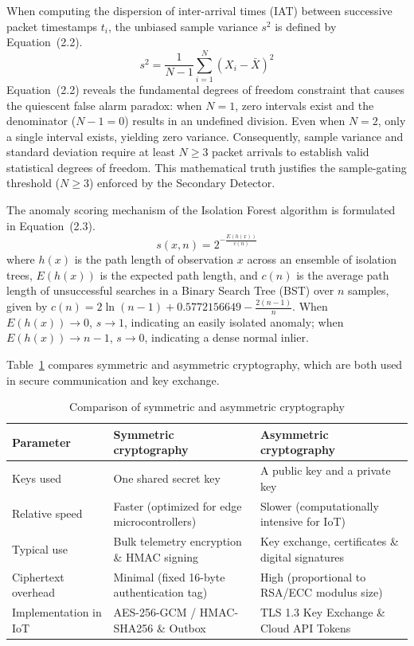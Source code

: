 \documentclass[11pt,a4paper]{report}
\begin{document}
When computing the dispersion of inter-arrival times (IAT) between successive packet timestamps $t_i$, the unbiased sample variance $s^2$ is defined by Equation~(2.2).
\begin{equation}
s^2 = \frac{1}{N - 1} \sum_{i=1}^{N} (X_i - \bar{X})^2 \label{eq:variance}
\end{equation}
Equation~(2.2) reveals the fundamental degrees of freedom constraint that causes the quiescent false alarm paradox: when $N = 1$, zero intervals exist and the denominator ($N - 1 = 0$) results in an undefined division. Even when $N = 2$, only a single interval exists, yielding zero variance. Consequently, sample variance and standard deviation require at least $N \ge 3$ packet arrivals to establish valid statistical degrees of freedom. This mathematical truth justifies the sample-gating threshold ($N \ge 3$) enforced by the Secondary Detector.

The anomaly scoring mechanism of the Isolation Forest algorithm is formulated in Equation~(2.3).
\begin{equation}
s(x, n) = 2^{-\frac{E(h(x))}{c(n)}} \label{eq:iso_score}
\end{equation}
where $h(x)$ is the path length of observation $x$ across an ensemble of isolation trees, $E(h(x))$ is the expected path length, and $c(n)$ is the average path length of unsuccessful searches in a Binary Search Tree (BST) over $n$ samples, given by $c(n) = 2 \ln(n - 1) + 0.5772156649 - \frac{2(n - 1)}{n}$. When $E(h(x)) \to 0$, $s \to 1$, indicating an easily isolated anomaly; when $E(h(x)) \to n - 1$, $s \to 0$, indicating a dense normal inlier.

Table~\ref{tab:crypto_comparison} compares symmetric and asymmetric cryptography, which are both used in secure communication and key exchange.

\begin{table}[htbp]
\centering
\caption{Comparison of symmetric and asymmetric cryptography}\label{tab:crypto_comparison}
\vspace{4pt}
{\small
\begin{tabular}{|p{3.2cm}|p{5.5cm}|p{5.5cm}|}
\hline
\rowcolor{black!10}
\textbf{Parameter} & \textbf{Symmetric cryptography} & \textbf{Asymmetric cryptography} \\
\hline
Keys used & One shared secret key & A public key and a private key \\
\hline
Relative speed & Faster (optimized for edge microcontrollers) & Slower (computationally intensive for IoT) \\
\hline
Typical use & Bulk telemetry encryption \& HMAC signing & Key exchange, certificates \& digital signatures \\
\hline
Ciphertext overhead & Minimal (fixed 16-byte authentication tag) & High (proportional to RSA/ECC modulus size) \\
\hline
Implementation in IoT & AES-256-GCM / HMAC-SHA256 \& Outbox & TLS 1.3 Key Exchange \& Cloud API Tokens \\
\hline
\end{tabular}
}
\end{table}
\end{document}
